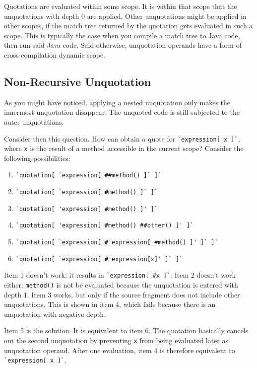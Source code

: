 Quotations are evaluated within some scope. It is within that scope that the
unquotations with depth 0 are applied. Other unquotations might be applied in
other scopes, if the match tree returned by the quotation gets evaluated in such
a scope. This is typically the case when you compile a match tree to Java code,
then run said Java code. Said otherwise, unquotation operands have a form of
cross-compilation dynamic scope.

\subsection{Non-Recursive Unquotation}
\label{non_recur_unquot}

As you might have noticed, applying a nested unquotation only makes the
innermost unquotation disappear. The unquoted code is still subjected to the
outer unquotations.

Consider then this question. How can obtain a quote for
\lstinline{`expression[ x ]`}, where \texttt{x} is the result of
a method accessible in the current scope?
Consider the following possibilities:

\begin{enumerate}
\item \lstinline{`quotation[ `expression[ ##method() ]` ]`}
\item \lstinline{`quotation[ `expression[ #method() ]` ]`}
\item \lstinline{`quotation[ 'expression[ #method() ]' ]`}
\item \lstinline{`quotation[ 'expression[ #method() ##other() ]' ]`}
\item \lstinline{`quotation[ `expression[ #'expression[ #method() ]' ]` ]`}
\item \lstinline{`quotation[ `expression[ #'expression[x]' ]` ]`}
\end{enumerate}

Item 1 doesn't work: it results in \lstinline{`expression[ #x ]`}. Item 2
doesn't work either: \texttt{method()} is not be evaluated because the
unquotation is entered with depth 1. Item 3 works, but only if the source
fragment does not include other unquotations. This is shown in item 4, which
fails because there is an unquotation with negative depth.

Item 5 is the solution. It is equivalent to item 6. The quotation basically
cancels out the second unquotation by preventing \texttt{x} from being evaluated
later as unquotation operand. After one evaluation, item 4 is therefore
equivalent to \lstinline{`expression[ x ]`}.

